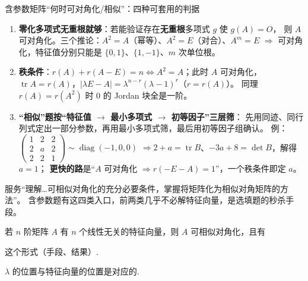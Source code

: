 \begin{fdeep}{含参数矩阵“何时可对角化/相似”：四种可套用的判据}
\begin{enumerate}[leftmargin=1.8em,itemsep=0.2em]
\item \textbf{零化多项式无重根就够}：若能验证存在\textbf{无重根}多项式 $g$ 使 $g(A)=O$，
      则 $A$ 可对角化。三个推论：$A^{2}=A$（幂等）、$A^{2}=E$（对合）、$A^{m}=E$
      $\Longrightarrow$ 可对角化，特征值分别只能是 $\{0,1\}$、$\{1,-1\}$、$m$ 次单位根。
\item \textbf{秩条件}：$r(A)+r(A-E)=n\iff A^{2}=A$；此时 $A$ 可对角化，
      $\operatorname{tr}A=r(A)$，$\lvert\lambda E-A\rvert=\lambda^{n-r}(\lambda-1)^{r}$（$r=r(A)$）。
      同理 $r(A)=r(A^{2})$ 时 $0$ 的 Jordan 块全是一阶。
\item \textbf{“相似”题按“特征值 $\to$ 最小多项式 $\to$ 初等因子”三层筛}：
      先用同迹、同行列式定出一部分参数，再用最小多项式筛，最后用初等因子组确认。
      例：$\begin{pmatrix}1&2&2\\2&a&2\\2&2&1\end{pmatrix}\sim\operatorname{diag}(-1,0,0)$
      $\Rightarrow 2+a=\operatorname{tr}B$、$-3a+8=\det B$，解得 $a=1$；
      \textbf{更快的路}是“$A$ 可对角化 $\Rightarrow r(-E-A)=1$”，一个秩条件即定 $a$。
\end{enumerate}
\fbref{}服务“理解…可相似对角化的充分必要条件，掌握将矩阵化为相似对角矩阵的方法”。
含参数题有这四类入口，前两类几乎不必解特征向量，是选填题的秒杀手段。
\end{fdeep}


若 $n$ 阶矩阵 $A$ 有 $n$ 个线性无关的特征向量，则 $A$ 可相似对角化，且有



这个形式（手段、结果）.


$\lambda$ 的位置与特征向量的位置是对应的.


